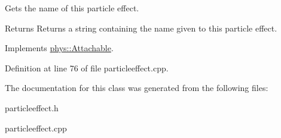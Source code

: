 Gets the name of this particle effect. 

\begin{DoxyReturn}{Returns}
Returns a string containing the name given to this particle effect. 
\end{DoxyReturn}


Implements \hyperlink{classphys_1_1Attachable_a56d2f5a6f17c14ff0c1d9906d17b0f52}{phys::Attachable}.



Definition at line 76 of file particleeffect.cpp.



The documentation for this class was generated from the following files:\begin{DoxyCompactItemize}
\item 
particleeffect.h\item 
particleeffect.cpp\end{DoxyCompactItemize}
